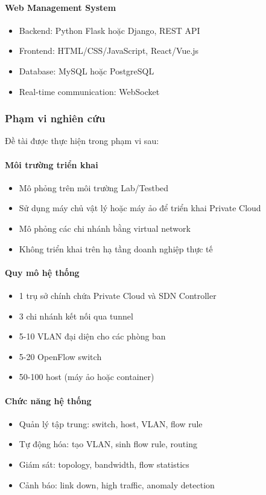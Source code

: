 \paragraph{Web Management System}
\begin{itemize}
    \item Backend: Python Flask hoặc Django, REST API
    \item Frontend: HTML/CSS/JavaScript, React/Vue.js
    \item Database: MySQL hoặc PostgreSQL
    \item Real-time communication: WebSocket
\end{itemize}

\subsubsection{Phạm vi nghiên cứu}

Đề tài được thực hiện trong phạm vi sau:

\paragraph{Môi trường triển khai}
\begin{itemize}
    \item Mô phỏng trên môi trường Lab/Testbed
    \item Sử dụng máy chủ vật lý hoặc máy ảo để triển khai Private Cloud
    \item Mô phỏng các chi nhánh bằng virtual network
    \item Không triển khai trên hạ tầng doanh nghiệp thực tế
\end{itemize}

\paragraph{Quy mô hệ thống}
\begin{itemize}
    \item 1 trụ sở chính chứa Private Cloud và SDN Controller
    \item 3 chi nhánh kết nối qua tunnel
    \item 5-10 VLAN đại diện cho các phòng ban
    \item 5-20 OpenFlow switch
    \item 50-100 host (máy ảo hoặc container)
\end{itemize}

\paragraph{Chức năng hệ thống}
\begin{itemize}
    \item Quản lý tập trung: switch, host, VLAN, flow rule
    \item Tự động hóa: tạo VLAN, sinh flow rule, routing
    \item Giám sát: topology, bandwidth, flow statistics
    \item Cảnh báo: link down, high traffic, anomaly detection
\end{itemize}

